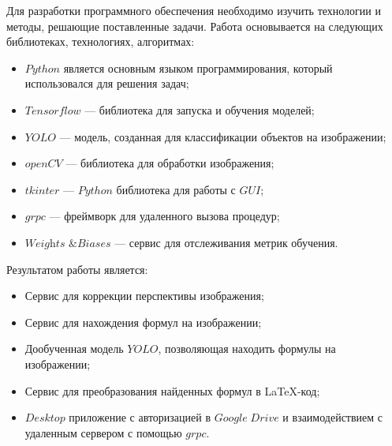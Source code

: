 Для разработки программного обеспечения необходимо изучить технологии и методы, решающие поставленные задачи. Работа основывается на следующих библиотеках, технологиях, алгоритмах:
\begin{itemize}
    \item $Python$ является основным языком программирования, который использовался для решения задач;
    \item $Tensorflow$ --- библиотека для запуска и обучения моделей;
    \item $YOLO$ --- модель, созданная для классификации объектов на изображении;
    \item $openCV$ --- библиотека для обработки изображения;
    \item $tkinter$ --- $Python$ библиотека для работы с $GUI$;
    \item $grpc$ --- фреймворк для удаленного вызова процедур;
    \item $\textit{Weights \& Biases}$ --- сервис для отслеживания метрик обучения.
\end{itemize}

Результатом работы является:
\begin{itemize}
    \item Сервис для коррекции перспективы изображения;
    \item Сервис для нахождения формул на изображении;
    \item Дообученная модель $YOLO$, позволяющая находить формулы на изображении;
    \item Сервис для преобразования найденных формул в \LaTeX-код;
    \item $Desktop$ приложение с авторизацией в $Google\; Drive$ и взаимодействием с удаленным сервером с помощью $grpc$.
\end{itemize}